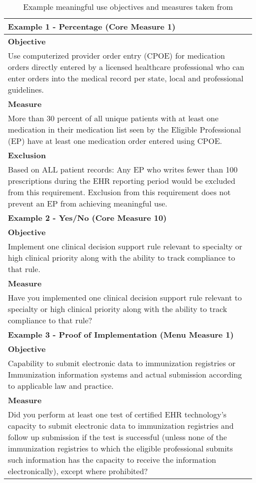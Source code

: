 \begin{center}
	\begin{table}
\begin{tabular}{ p{15cm} }
	\hline
	\hline
\textbf{Example 1 - Percentage (Core Measure 1)} \\
	\hline
\textbf{Objective} \\
Use computerized provider order entry (CPOE) for medication orders directly entered by a licensed healthcare professional who can enter orders into the medical record per state, local and professional guidelines. \\
\textbf{Measure} \\
More than 30 percent of all unique patients with at least one medication in their medication list seen by the Eligible Professional (EP) have at least one medication order entered using CPOE. \\
\textbf{Exclusion} \\
Based on ALL patient records: Any EP who writes fewer than 100 prescriptions during the EHR reporting period would be excluded from this requirement. Exclusion from  this requirement does not prevent an EP from achieving meaningful use. \\
	\hline
	\hline
\textbf{Example 2 - Yes/No (Core Measure 10)} \\
	\hline
\textbf{Objective} \\
Implement one clinical decision support rule relevant to specialty or high clinical priority along with the ability to track compliance to that rule. \\
\textbf{Measure} \\
Have you implemented one clinical decision support rule relevant to specialty or high clinical priority along with the ability to track compliance to that rule? \\
	\hline
	\hline
\textbf{Example 3 - Proof of Implementation (Menu Measure 1)} \\
	\hline
\textbf{Objective} \\
Capability to submit electronic data to immunization registries or Immunization information systems and actual submission according to applicable law and practice. \\
\textbf{Measure} \\
Did you perform at least one test of certified EHR technology’s capacity to submit electronic data to immunization registries and follow up submission if the test is successful (unless none of the immunization registries to which the eligible professional submits such information has the capacity to receive the information electronically), except where prohibited? \\
	\hline
\end{tabular}
\label{table:mu_metrics_example}
\caption[Table caption text]{Example meaningful use objectives and measures taken from \cite{mu1-calc}}
\end{table}
\end{center}